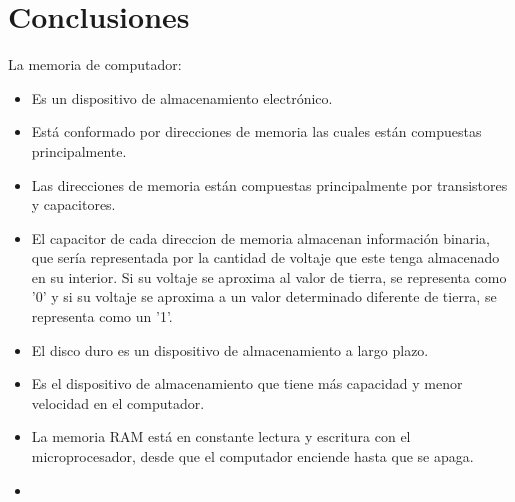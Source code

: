 \documentclass{article}
\begin{document}


\section{Conclusiones} \label{conclulsion}








\cite{referencia}
La memoria de computador:
    \begin{itemize}
        \item
            Es un dispositivo de almacenamiento electrónico.
        \item 
            Está conformado por direcciones de memoria las cuales están compuestas principalmente.
            
            
            
            
        \item 
            Las direcciones de memoria están compuestas principalmente por transistores y capacitores.
        \item 
             El capacitor de cada direccion de memoria almacenan información binaria, que sería representada por la cantidad de voltaje que este tenga almacenado en su interior. Si su voltaje se aproxima al valor de tierra, se representa como '0' y si su voltaje se aproxima a un valor determinado diferente de tierra, se representa como un '1'.
             
             
             
             
             
        \item
            El disco duro es un dispositivo de almacenamiento a largo plazo.
            
        \item
            Es el dispositivo de almacenamiento que tiene más capacidad y menor velocidad en el computador.
            
        \item
            La memoria RAM está en constante lectura y escritura con el microprocesador, desde que el computador enciende hasta que se apaga.
        
            
        \item
            
    \end{itemize}
\end{document}
